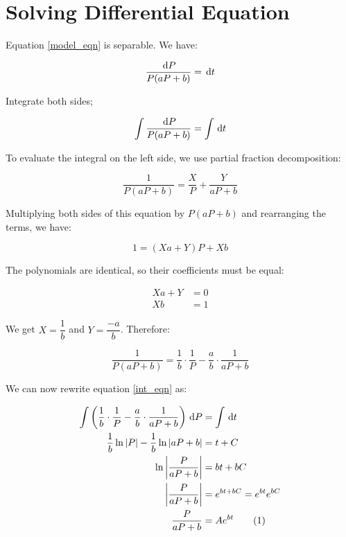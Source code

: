 \documentclass[12pt]{scrartcl}
\newcommand{\abs}[1]{\left | #1 \right |}
\newcommand\numberthis{\addtocounter{equation}{1}\tag{\theequation}}
\begin{document}
\section*{Solving Differential Equation}

Equation \ref{model_eqn} is separable. We have:

\begin{equation}
\frac{\dl{P}}{P(aP + b)} = \dl{t}
\end{equation}

Integrate both sides;

\begin{equation} \label{int_eqn}
\int \frac{\dl{P}}{P(aP + b)} = \int \dl{t}
\end{equation}

To evaluate the integral on the left side, we use partial fraction decomposition:

\begin{equation*}
\frac{1}{P(aP + b)} = \frac{X}{P} + \frac{Y}{aP + b}
\end{equation*}

Multiplying both sides of this equation by $P(aP + b)$ and rearranging the terms, we have:

\begin{equation*}
1 = (Xa + Y)P + Xb
\end{equation*}

The polynomials are identical, so their coefficients must be equal:

\begin{align*}
Xa + Y &= 0 \\
Xb &= 1
\end{align*}

We get $X = \dfrac{1}{b}$ and $Y = \dfrac{-a}{b}$. Therefore:

\begin{equation*}
\frac{1}{P(aP + b)} = \frac{1}{b} \cdot \frac{1}{P} - \frac{a}{b} \cdot \frac{1}{aP + b}
\end{equation*}

We can now rewrite equation \ref{int_eqn} as:

\begin{align*}
\int \left ( \frac{1}{b} \cdot \frac{1}{P} - \frac{a}{b} \cdot \frac{1}{aP + b} \right ) \dl{P} &= \int \dl{t} \\
\frac{1}{b} \ln \abs{P} - \frac{1}{b} \ln \abs{aP + b} &= t + C \\
\ln \abs{\frac{P}{aP + b}} &= bt + bC \\
\abs{\frac{P}{aP + b}} &= e^{bt + bC} = e^{bt}e^{bC} \\
\frac{P}{aP + b} &= Ae^{bt} \numberthis \label{int2_eqn}
\end{align*}
\end{document}
